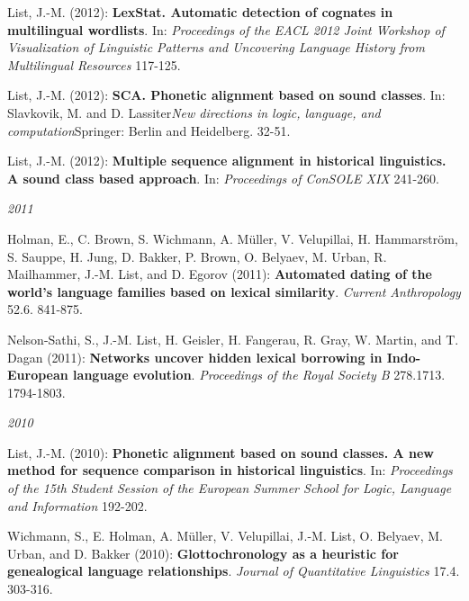 \par
\nopagebreak\noindent List, J.-M. (2012): \textbf{LexStat. Automatic detection of cognates in multilingual wordlists}. In: \textit{Proceedings of the EACL 2012 Joint Workshop of Visualization of Linguistic Patterns and Uncovering Language History from Multilingual Resources} 117-125.\vspace{0.25cm}
\par
\nopagebreak\noindent List, J.-M. (2012): \textbf{SCA. Phonetic alignment based on sound classes}. In: Slavkovik, M. and D. Lassiter\textit{New directions in logic, language, and computation}Springer: Berlin and Heidelberg. 32-51.\vspace{0.25cm}
\par
\nopagebreak\noindent List, J.-M. (2012): \textbf{Multiple sequence alignment in historical linguistics}\textbf{. A sound class based approach}. In: \textit{Proceedings of ConSOLE XIX} 241-260.\vspace{0.25cm}
\par
\noindent\textit{2011}\par\nopagebreak\vspace{0.25cm}
\nopagebreak\noindent Holman, E., C. Brown, S. Wichmann, A. M\"uller, V. Velupillai, H. Hammarstr\"om, S. Sauppe, H. Jung, D. Bakker, P. Brown, O. Belyaev, M. Urban, R. Mailhammer, J.-M. List, and D. Egorov (2011): \textbf{Automated dating of the world's language families based on lexical similarity}. \textit{Current Anthropology} 52.6. 841-875.\vspace{0.25cm}
\par
\nopagebreak\noindent Nelson-Sathi, S., J.-M. List, H. Geisler, H. Fangerau, R. Gray, W. Martin, and T. Dagan (2011): \textbf{Networks uncover hidden lexical borrowing in Indo-European language evolution}. \textit{Proceedings of the Royal Society B} 278.1713. 1794-1803.\vspace{0.25cm}
\par
\noindent\textit{2010}\par\nopagebreak\vspace{0.25cm}
\nopagebreak\noindent List, J.-M. (2010): \textbf{Phonetic alignment based on sound classes}\textbf{. A new method for sequence comparison in historical linguistics}. In: \textit{Proceedings of the 15th Student Session of the European Summer School for Logic, Language and Information} 192-202.\vspace{0.25cm}
\par
\nopagebreak\noindent Wichmann, S., E. Holman, A. Müller, V. Velupillai, J.-M. List, O. Belyaev, M. Urban, and D. Bakker (2010): \textbf{Glottochronology as a heuristic for genealogical language relationships}. \textit{Journal of Quantitative Linguistics} 17.4. 303-316.\vspace{0.25cm}
